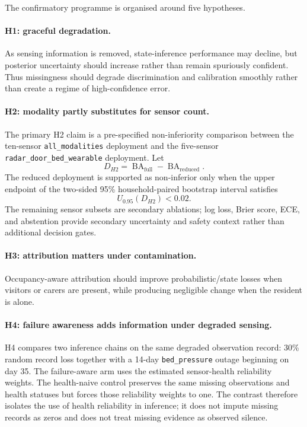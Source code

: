 \documentclass[11pt]{article}
\begin{document}
The confirmatory programme is organised around five hypotheses.

\paragraph{H1: graceful degradation.}
As sensing information is removed, state-inference performance may decline, but posterior uncertainty should increase rather than remain spuriously confident. Thus missingness should degrade discrimination and calibration smoothly rather than create a regime of high-confidence error.

\paragraph{H2: modality partly substitutes for sensor count.}
The primary H2 claim is a pre-specified non-inferiority comparison between the ten-sensor \texttt{all\_modalities} deployment and the five-sensor \texttt{radar\_door\_bed\_wearable} deployment. Let
\begin{equation}
D_{H2}=\operatorname{BA}_{\mathrm{full}}-\operatorname{BA}_{\mathrm{reduced}}.
\end{equation}
The reduced deployment is supported as non-inferior only when the upper endpoint of the two-sided 95\% household-paired bootstrap interval satisfies
\begin{equation}
U_{0.95}(D_{H2}) < 0.02.
\end{equation}
The remaining sensor subsets are secondary ablations; log loss, Brier score, ECE, and abstention provide secondary uncertainty and safety context rather than additional decision gates.

\paragraph{H3: attribution matters under contamination.}
Occupancy-aware attribution should improve probabilistic/state losses when visitors or carers are present, while producing negligible change when the resident is alone.

\paragraph{H4: failure awareness adds information under degraded sensing.}
H4 compares two inference chains on the same degraded observation record: 30\% random record loss together with a 14-day \texttt{bed\_pressure} outage beginning on day 35. The failure-aware arm uses the estimated sensor-health reliability weights. The health-naive control preserves the same missing observations and health statuses but forces those reliability weights to one. The contrast therefore isolates the use of health reliability in inference; it does not impute missing records as zeros and does not treat missing evidence as observed silence.
\end{document}
